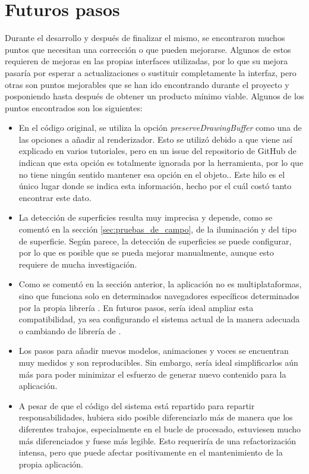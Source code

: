 \documentclass{subfiles}
\begin{document}
    \section{Futuros pasos}
    \label{sec:futuros_pasos}
    Durante el desarrollo y después de finalizar el mismo, se encontraron muchos puntos que necesitan una corrección o que pueden mejorarse. Algunos de estos requieren de mejoras en las propias interfaces utilizadas, por lo que su mejora pasaría por esperar a actualizaciones o sustituir completamente la interfaz, pero otras son puntos mejorables que se han ido encontrando durante el proyecto y posponiendo hasta después de obtener un producto mínimo viable. Algunos de los puntos encontrados son los siguientes:
    \begin{itemize}
        \item En el código original, se utiliza la opción \textit{preserveDrawingBuffer} como una de las opciones a añadir al renderizador. Esto se utilizó debido a que viene así explicado en varios tutoriales, pero en un issue del repositorio de GitHub de \webxr indican que esta opción es totalmente ignorada por la herramienta, por lo que no tiene ningún sentido mantener esa opción en el objeto.\cite{web:webxr_github_preserveDrawingBuffer}. Este hilo es el único lugar donde se indica esta información, hecho por el cuál costó tanto encontrar este dato.
        \item La detección de superficies resulta muy imprecisa y depende, como se comentó en la sección \ref{sec:pruebas_de_campo}, de la iluminación y del tipo de superficie. Según parece, la detección de superficies se puede configurar, por lo que es posible que se pueda mejorar manualmente, aunque esto requiere de mucha investigación.
        \item Como se comentó en la sección anterior, la aplicación no es multiplataformas, sino que funciona solo en determinados navegadores específicos determinados por la propia librería \webxr. En futuros pasos, sería ideal ampliar esta compatibilidad, ya sea configurando el sistema actual de la manera adecuada o cambiando de librería de \ra.
        \item Los pasos para añadir nuevos modelos, animaciones y voces se encuentran muy medidos y son reproducibles. Sin embargo, sería ideal simplificarlos aún más para poder minimizar el esfuerzo de generar nuevo contenido para la aplicación.
        \item A pesar de que el código del sistema está repartido para repartir responsabilidades, hubiera sido posible diferenciarlo más de manera que los diferentes trabajos, especialmente en el bucle de procesado, estuviesen mucho más diferenciados y fuese más legible. Esto requeriría de una refactorización intensa, pero que puede afectar positivamente en el mantenimiento de la propia aplicación.

\end{itemize}
\end{document}
